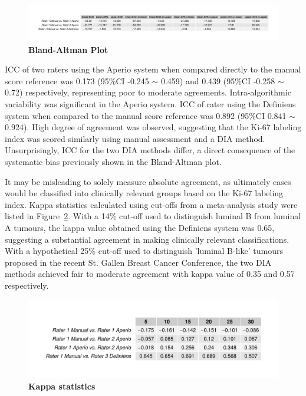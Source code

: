 \documentclass[final,5p,times,twocolumn]{elsarticle}
\begin{document}
\begin{figure}
\includegraphics[width = \linewidth]{baStat}

\centering
\caption{{\bf Bland-Altman Plot}}
\label{baplot}
\end{figure}


ICC of two raters using the Aperio system when compared directly to the manual score reference was 0.173 (95\%CI -0.245 $\sim$ 0.459) and 0.439 (95\%CI -0.258 $\sim$  0.72) respectively, representing poor to moderate agreements. Intra-algorithmic variability was significant in the Aperio system. ICC of rater using the Definiens system when compared to the manual score reference was 0.892 (95\%CI 0.841 $\sim$ 0.924). High degree of agreement was observed, suggesting that the Ki-67 labeling index was scored similarly using manual assessment and a DIA method. Unsurprisingly, ICC for the two DIA methods differ, a direct consequence of the systematic bias previously shown in the Bland-Altman plot.

It may be misleading to solely measure absolute agreement, as ultimately cases would be classified into clinically relevant groups based on the Ki-67 labeling index. Kappa statistics calculated using cut-offs from a meta-analysis study were listed in Figure~\ref{kappaStat}. \cite{Petrelli2015} With a 14\% cut-off used to distinguish  luminal B from luminal A tumours, \cite{Cheang2009} the kappa value obtained using the Definiens system was 0.65, suggesting a substantial agreement in making clinically relevant classifications. \cite{Landis1977} With a hypothetical 25\% cut-off used to distinguish {'}luminal B-like{'} tumours proposed in the recent St. Gallen Breast Cancer Conference, \cite{Coates2015} the two DIA methods achieved fair to moderate agreement with kappa value of 0.35 and 0.57 respectively.


\begin{figure}
\includegraphics[width = \linewidth]{kappaStat}
\centering
\caption{{\bf Kappa statistics }}
\label{kappaStat}
\end{figure}
\end{document}
